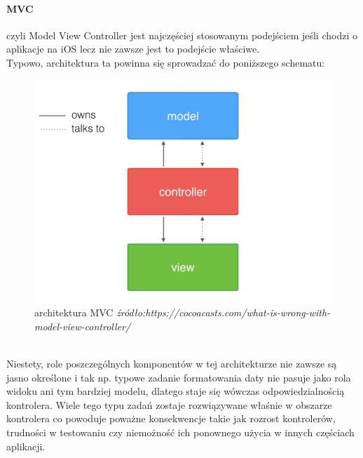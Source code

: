 \documentclass[12pt,oneside,a4paper]{report}
\begin{document}
\paragraph{MVC}czyli Model View Controller jest najczęściej stosowanym podejściem jeśli chodzi o aplikacje na iOS lecz nie zawsze jest to podejście właściwe. \\
Typowo, architektura ta powinna się sprowadzać do poniższego schematu:
	\begin{figure}[ht!]
	\centering
	\includegraphics[width=13cm]{MVC}
	\caption{architektura MVC
		\textit{źródło:https://cocoacasts.com/what-is-wrong-with-model-view-controller/}}
	\label{MVC}
\end{figure}\\
Niestety, role poszczególnych komponentów w tej architekturze nie zawsze są jasno określone i tak np. typowe zadanie formatowania daty nie pasuje jako rola widoku ani tym bardziej modelu, dlatego staje się wówczas odpowiedzialnością kontrolera. Wiele tego typu zadań zostaje rozwiązywane właśnie w obszarze kontrolera co powoduje poważne konsekwencje takie jak rozrost kontrolerów, trudności w testowaniu czy niemożność ich ponownego użycia w innych częściach aplikacji.
\end{document}
